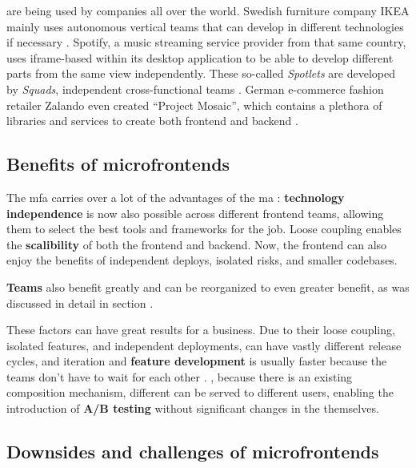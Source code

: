  are being used by companies all over the world.
Swedish furniture company IKEA mainly uses autonomous vertical teams that can
develop in different technologies if necessary \autocite{Stenberg_2018}.
Spotify, a music streaming service provider from that same country, uses
\gls{iframe}-based  within its desktop application to
be able to develop different parts from the same view independently. These
so-called \textit{Spotlets} are developed by \textit{Squads}, independent
cross-functional teams \autocite{Gall_2018}. German e-commerce fashion retailer
Zalando even created ``Project Mosaic'',
which contains a plethora of libraries and services to create both
\gls{frontend} and \gls{backend} .



\subsection{Benefits of microfrontends}

The \gls{mfa} carries over a lot of the advantages of the \gls{ma}
\autocite{Jackson_2019}: \textbf{technology independence} is now also possible
across different \gls{frontend} teams, allowing them to select the best tools
and frameworks for the job. Loose coupling enables the \textbf{scalibility} of
both the \gls{frontend} and \gls{backend}. Now, the \gls{frontend} can also
enjoy the benefits of independent deploys, isolated risks, and smaller
codebases.

\textbf{Teams} also benefit greatly and can be reorganized to even greater
benefit, as was discussed in detail in section .

These factors can have great results for a business. Due to their loose
coupling, isolated features, and independent deployments,
 can have vastly different release cycles, and
iteration and \textbf{feature development} is usually faster because the teams
don't have to wait for each other \autocite{Geers_2020}. \textcite{Rappl_2021},
because there is an existing composition mechanism, different
 can be served to different users, enabling the
introduction of \textbf{A/B testing} without significant changes in the
 themselves.

\subsection{Downsides and challenges of microfrontends}

